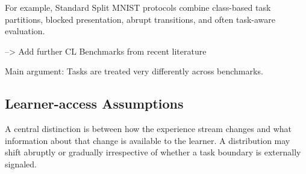 \documentclass{article}
\begin{document}
        \begin{table}[t]
            \centering
            \caption{Different continual learning benchmarks implicitly adopt different notions of what constitutes a task.}
            \label{tab:task_definitions}
        \end{table}

        For example, Standard Split MNIST protocols combine class-based task partitions, blocked presentation, abrupt transitions, and often task-aware evaluation. \cite{hsu2019reevaluatingcontinuallearningscenarios}
        
        --> Add further CL Benchmarks from recent literature

        
        Main argument: Tasks are treated very differently across benchmarks.

        \subsection{Learner-access Assumptions}

        A central distinction is between how the experience stream changes and what information about that change is available to the learner. A distribution may shift abruptly or gradually irrespective of whether a task boundary is externally signaled. 
        
\end{document}
